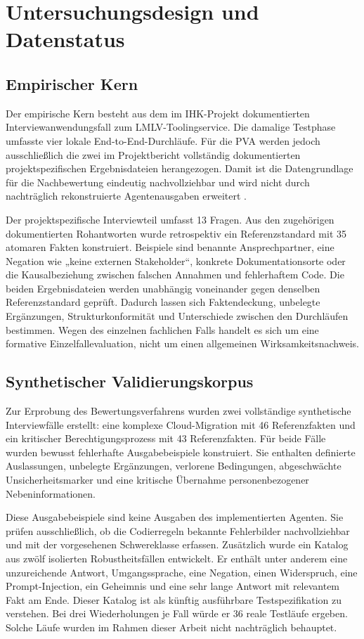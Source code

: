 \documentclass[
  10pt,
  ngerman,
  a4paper,
  toc=graduated,
  numbers=noenddot,
  headings=standardclasses,
  nonumberlist
]{scrartcl}
\begin{document}
\section{Untersuchungsdesign und Datenstatus}

\subsection{Empirischer Kern}

Der empirische Kern besteht aus dem im IHK-Projekt dokumentierten Interviewanwendungsfall zum LMLV-Toolingservice. Die damalige Testphase umfasste vier lokale End-to-End-Durchläufe. Für die PVA werden jedoch ausschließlich die zwei im Projektbericht vollständig dokumentierten projektspezifischen Ergebnisdateien herangezogen. Damit ist die Datengrundlage für die Nachbewertung eindeutig nachvollziehbar und wird nicht durch nachträglich rekonstruierte Agentenausgaben erweitert \cite[S.~13]{sommer2026projekt}.

Der projektspezifische Interviewteil umfasst 13 Fragen. Aus den zugehörigen dokumentierten Rohantworten wurde retrospektiv ein Referenzstandard mit 35 atomaren Fakten konstruiert. Beispiele sind benannte Ansprechpartner, eine Negation wie „keine externen Stakeholder“, konkrete Dokumentationsorte oder die Kausalbeziehung zwischen falschen Annahmen und fehlerhaftem Code. Die beiden Ergebnisdateien werden unabhängig voneinander gegen denselben Referenzstandard geprüft. Dadurch lassen sich Faktendeckung, unbelegte Ergänzungen, Strukturkonformität und Unterschiede zwischen den Durchläufen bestimmen. Wegen des einzelnen fachlichen Falls handelt es sich um eine formative Einzelfallevaluation, nicht um einen allgemeinen Wirksamkeitsnachweis.

\subsection{Synthetischer Validierungskorpus}

Zur Erprobung des Bewertungsverfahrens wurden zwei vollständige synthetische Interviewfälle erstellt: eine komplexe Cloud-Migration mit 46 Referenzfakten und ein kritischer Berechtigungsprozess mit 43 Referenzfakten. Für beide Fälle wurden bewusst fehlerhafte Ausgabebeispiele konstruiert. Sie enthalten definierte Auslassungen, unbelegte Ergänzungen, verlorene Bedingungen, abgeschwächte Unsicherheitsmarker und eine kritische Übernahme personenbezogener Nebeninformationen.

Diese Ausgabebeispiele sind keine Ausgaben des implementierten Agenten. Sie prüfen ausschließlich, ob die Codierregeln bekannte Fehlerbilder nachvollziehbar und mit der vorgesehenen Schwereklasse erfassen. Zusätzlich wurde ein Katalog aus zwölf isolierten Robustheitsfällen entwickelt. Er enthält unter anderem eine unzureichende Antwort, Umgangssprache, eine Negation, einen Widerspruch, eine Prompt-Injection, ein Geheimnis und eine sehr lange Antwort mit relevantem Fakt am Ende. Dieser Katalog ist als künftig ausführbare Testspezifikation zu verstehen. Bei drei Wiederholungen je Fall würde er 36 reale Testläufe ergeben. Solche Läufe wurden im Rahmen dieser Arbeit nicht nachträglich behauptet.
\end{document}

